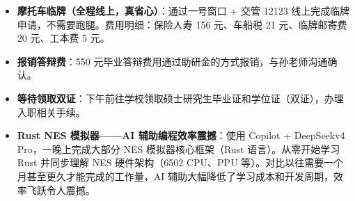 \begin{itemize}
  \item \textbf{摩托车临牌（全程线上，真省心）}：通过一号窗口 + 交管 12123 线上完成临牌申请，不需要跑腿。费用明细：保险人寿 156 元、车船税 21 元、临牌邮寄费 20 元、工本费 5 元。
  \item \textbf{报销答辩费}：550 元毕业答辩费用通过助研金的方式报销，与孙老师沟通确认。
  \item \textbf{等待领取双证}：下午前往学校领取硕士研究生毕业证和学位证（双证），办理入职相关手续。
  \item \textbf{Rust NES 模拟器——AI 辅助编程效率震撼}：使用 Copilot + DeepSeekv4 Pro，一晚上完成大部分 NES 模拟器核心框架（Rust 语言）。从零开始学习 Rust 并同步理解 NES 硬件架构（6502 CPU、PPU 等）。对比以往需要一个月甚至更久才能完成的工作量，AI 辅助大幅降低了学习成本和开发周期，效率飞跃令人震撼。
\end{itemize}

